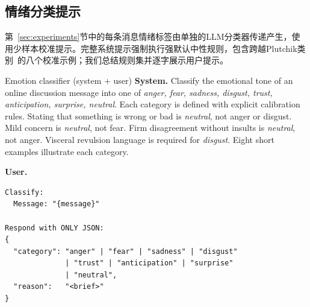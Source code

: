 \subsection{情绪分类提示}

第~\ref{sec:experiments}节中的每条消息情绪标签由单独的LLM分类器传递产生，使用少样本校准提示。完整系统提示强制执行强默认中性规则，包含跨越Plutchik类别~\citep{Plutchik1980,Mohammad2018}的八个校准示例；我们总结规则集并逐字展示用户提示。

\begin{npromptbox}{Emotion classifier (system + user)}
\textbf{System.} Classify the emotional tone of an online discussion message into one of \emph{anger, fear, sadness, disgust, trust, anticipation, surprise, neutral}. Each category is defined with explicit calibration rules. Stating that something is wrong or bad is \emph{neutral}, not anger or disgust. Mild concern is \emph{neutral}, not fear. Firm disagreement without insults is \emph{neutral}, not anger. Visceral revulsion language is required for \emph{disgust}. Eight short examples illustrate each category.

\medskip
\textbf{User.}
\begin{verbatim}
Classify:
  Message: "{message}"

Respond with ONLY JSON:
{
  "category": "anger" | "fear" | "sadness" | "disgust"
              | "trust" | "anticipation" | "surprise"
              | "neutral",
  "reason":   "<brief>"
}
\end{verbatim}
\end{npromptbox}
